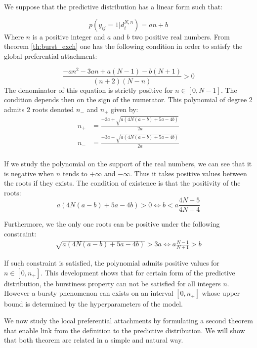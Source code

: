 We suppose that the predictive distribution has a linear form such that:

\begin{equation}
p(y_{ij}=1 | d_i^{N,n}) = an+b
\end{equation}  
Where $n$ is a positive integer and $a$ and $b$ two positive real numbers. From theorem \ref{th:burst_exch} one has the following condition in order to satisfy the global preferential attachment:

\begin{equation} \label{eq:polynom}
\frac{-an^2 -3an +a(N-1)-b(N+1)}{(n+2)(N-n)} > 0 
\end{equation}
The denominator of this equation is strictly positive for $n \in [0, N-1]$. The condition depends then on the sign of the numerator. This polynomial of degree 2 admits 2 roots denoted $n_-$ and $n_+$ given by:
\begin{align*}
n_+ &= \frac{-3a + \sqrt{a(4N(a-b)+5a-4b)}}{2a} \\
n_- &= \frac{-3a - \sqrt{a(4N(a-b)+5a-4b)}}{2a} \\
\end{align*}

If we study the polynomial on the support of the real numbers, we can see that it is negative when $n$ tends to $+\infty$ and $-\infty$. Thus it takes positive values between the roots if they exists. The condition of existence is that the positivity of the roots:
\begin{equation}
a(4N(a-b)+5a-4b) > 0 \iff b < a \frac{4N+5}{4N+4}
\end{equation}

Furthermore, we the only one roots can be positive under the following constraint:
\begin{align}
\sqrt{a(4N(a-b)+5a-4b)} > 3a \iff a\frac{N-1}{N+1} > b
\end{align}

If such constraint is satisfied, the polynomial admits positive values for $n \in [0, n_+]$. This development shows that for certain form of the predictive distribution, the burstiness property can not be satisfied for all integers $n$. However a bursty phenomenon can exists on an interval $[0, n_+]$ whose upper bound is determined by the hyperparameters of the model.

We now study the local preferential attachments by formulating a second theorem that enable link from the definition to the predictive distribution. We will show that both theorem are related in a simple and natural way.

